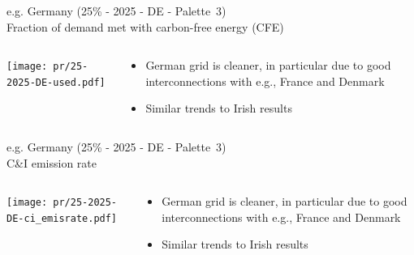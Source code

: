\begin{frame}{e.g. Germany (25\% - 2025 - DE - Palette~3) 
\\ Fraction of demand met with carbon-free energy (CFE)}

\begin{columns}[T]
\begin{column}{9cm}
\centering

\texttt{[image: pr/25-2025-DE-used.pdf]}
\end{column}
\begin{column}{5cm}

  \begin{itemize}
  \item German grid is cleaner, in particular due to good interconnections with e.g., France and Denmark
  \item Similar trends to Irish results
  \end{itemize}
  
\end{column}
\end{columns}

\end{frame}

\begin{frame}{e.g. Germany (25\% - 2025 - DE - Palette~3) 
\\ C\&I emission rate}

\begin{columns}[T]
\begin{column}{9cm}
\centering

\texttt{[image: pr/25-2025-DE-ci\_emisrate.pdf]}
\end{column}
\begin{column}{5cm}

  \begin{itemize}
  \item German grid is cleaner, in particular due to good interconnections with e.g., France and Denmark
  \item Similar trends to Irish results
  \end{itemize}
  
\end{column}
\end{columns}

\end{frame}


